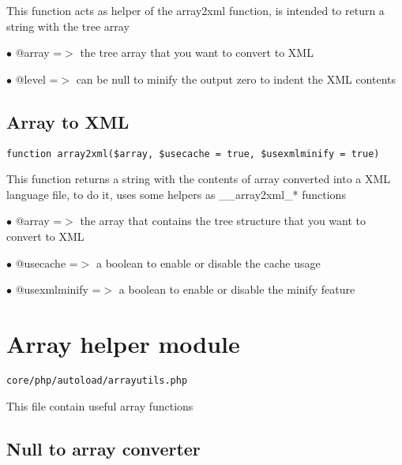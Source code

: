 \documentclass[a4paper]{book}
\begin{document}
This function acts as helper of the array2xml function, is intended to
return a string with the tree array

\begin{compactitem}
\item[\color{myblue}$\bullet$] @array =$>$ the tree array that you want to convert to XML
\item[\color{myblue}$\bullet$] @level =$>$ can be null to minify the output zero to indent the XML contents
\end{compactitem}

\hypertarget{toc35}{}
\subsection{Array to XML}

\begin{lstlisting}
function array2xml($array, $usecache = true, $usexmlminify = true)
\end{lstlisting}

This function returns a string with the contents of array converted into a XML
language file, to do it, uses some helpers as \_\_array2xml\_* functions

\begin{compactitem}
\item[\color{myblue}$\bullet$] @array        =$>$ the array that contains the tree structure that you want to convert to XML
\item[\color{myblue}$\bullet$] @usecache     =$>$ a boolean to enable or disable the cache usage
\item[\color{myblue}$\bullet$] @usexmlminify =$>$ a boolean to enable or disable the minify feature
\end{compactitem}

\hypertarget{toc36}{}
\section{Array helper module}

\begin{lstlisting}
core/php/autoload/arrayutils.php
\end{lstlisting}

This file contain useful array functions

\hypertarget{toc37}{}
\subsection{Null to array converter}
\end{document}

